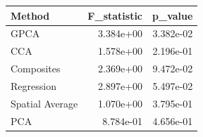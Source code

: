 \begin{tabular}{lrr}
\toprule
Method & F_statistic & p_value \\
\midrule
GPCA & 3.384e+00 & 3.382e-02 \\
CCA & 1.578e+00 & 2.196e-01 \\
Composites & 2.369e+00 & 9.472e-02 \\
Regression & 2.897e+00 & 5.497e-02 \\
Spatial Average & 1.070e+00 & 3.795e-01 \\
PCA & 8.784e-01 & 4.656e-01 \\
\bottomrule
\end{tabular}
